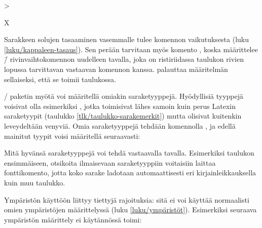 \begin{koodilohkosis}
>{\raggedright\arraybackslash}X
\end{koodilohkosis}

Sarakkeen solujen tasaaminen vasemmalle tulee komennon
 vaikutuksesta (luku \ref{luku/kappaleen-tasaus}).
Sen perään tarvitaan myös komento , koska
 määrittelee \komento{\keno}\=/ rivinvaihtokomennon
uudelleen tavalla, joka on ristiriidassa taulukon rivien lopussa
tarvittavan vastaavan komennon kanssa. 
palauttaa määritelmän sellaiseksi, että se toimii taulukossa.

\-/ paketin myötä voi määritellä omiakin
saraketyyppejä. Hyödyllisiä tyyppejä voisivat olla esimerkiksi
, jotka toimisivat lähes samoin kuin perus Latexin
saraketyypit  (taulukko \ref{tlk/taulukko-sarakemerkit})
mutta olisivat kuitenkin leveydeltään venyviä. Omia saraketyyppejä
tehdään komennolla , ja edellä mainitut tyypit
voisi määritellä seuraavasti:

\begin{koodilohkosis}
\end{koodilohkosis}

Mitä hyvänsä saraketyyppejä voi tehdä vastaavalla tavalla. Esimerkiksi
taulukon ensimmäiseen, otsikoita ilmaisevaan saraketyyppiin 
voitaisiin laittaa fonttikomento, jotta koko sarake ladotaan
automaattisesti eri kirjainleikkauksella kuin muu taulukko.

\begin{koodilohkosis}
\end{koodilohkosis}

Ympäristön  käyttöön liittyy tiettyjä rajoituksia:
sitä ei voi käyttää normaalisti omien ympäristöjen määrittelyssä (luku
\ref{luku/ympäristöt}). Esimerkiksi seuraava ympäristön määrittely ei
käytännössä toimi:

\begin{koodilohkosis}
\newenvironment{omataulukko}[1]
{\begin{tabularx}{\linewidth}{#1}}
{\end{tabularx}}
\end{koodilohkosis}

